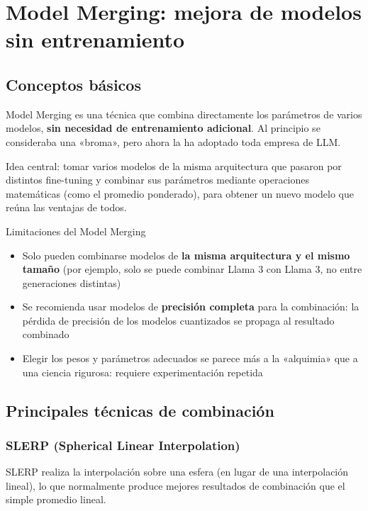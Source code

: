 \section{Model Merging: mejora de modelos sin entrenamiento}

\subsection{Conceptos básicos}

Model Merging es una técnica que combina directamente los parámetros de varios modelos, \textbf{sin necesidad de entrenamiento adicional}. Al principio se consideraba una «broma», pero ahora la ha adoptado toda empresa de LLM.

Idea central: tomar varios modelos de la misma arquitectura que pasaron por distintos fine-tuning y combinar sus parámetros mediante operaciones matemáticas (como el promedio ponderado), para obtener un nuevo modelo que reúna las ventajas de todos.

\begin{warningbox}{Limitaciones del Model Merging}
\begin{itemize}
    \item Solo pueden combinarse modelos de \textbf{la misma arquitectura y el mismo tamaño} (por ejemplo, solo se puede combinar Llama 3 con Llama 3, no entre generaciones distintas)
    \item Se recomienda usar modelos de \textbf{precisión completa} para la combinación: la pérdida de precisión de los modelos cuantizados se propaga al resultado combinado
    \item Elegir los pesos y parámetros adecuados se parece más a la «alquimia» que a una ciencia rigurosa: requiere experimentación repetida
\end{itemize}
\end{warningbox}

\subsection{Principales técnicas de combinación}

\subsubsection{SLERP (Spherical Linear Interpolation)}

SLERP realiza la interpolación sobre una esfera (en lugar de una interpolación lineal), lo que normalmente produce mejores resultados de combinación que el simple promedio lineal.

